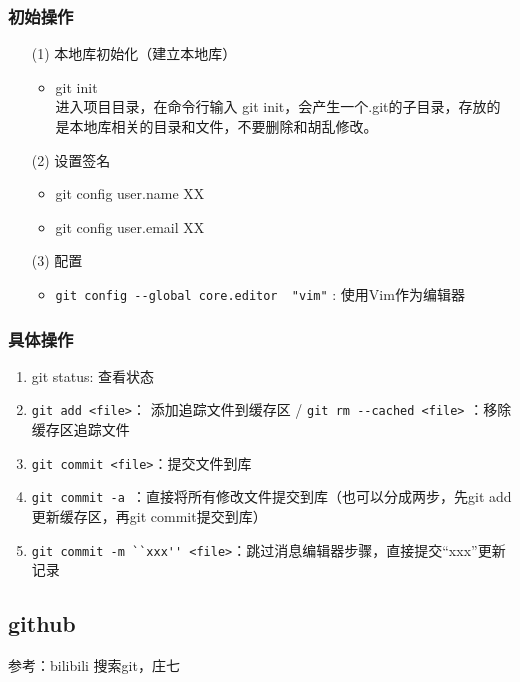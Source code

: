 \documentclass[a4paper,11pt,twoside]{book}
\begin{document}
\subsubsection{初始操作}
\begin{itemize}
\item[(1)] 本地库初始化（建立本地库）
\begin{itemize}
\item git init\\
进入项目目录，在命令行输入 git init，会产生一个.git的子目录，存放的是本地库相关的目录和文件，不要删除和胡乱修改。
\end{itemize}

\item[(2)] 设置签名
\begin{itemize}
\item git config user.name XX
\item git config user.email XX
\end{itemize}

\item [(3)] 配置
\begin{itemize}
\item \verb|git config --global core.editor  "vim"| : 使用Vim作为编辑器
\end{itemize}

\end{itemize}



\subsubsection{具体操作}
\begin{enumerate}
\item git status: 查看状态
\item \verb|git add <file>|： 添加追踪文件到缓存区 / \verb|git rm --cached <file>| ：移除缓存区追踪文件
\item \verb|git commit <file>|：提交文件到库
\item \verb|git commit -a |：直接将所有修改文件提交到库（也可以分成两步，先git add更新缓存区，再git commit提交到库）
\item \verb|git commit -m ``xxx'' <file>|：跳过消息编辑器步骤，直接提交“xxx”更新记录
\end{enumerate}



\subsection{github}
参考：bilibili 搜索git，庄七
\end{document}
